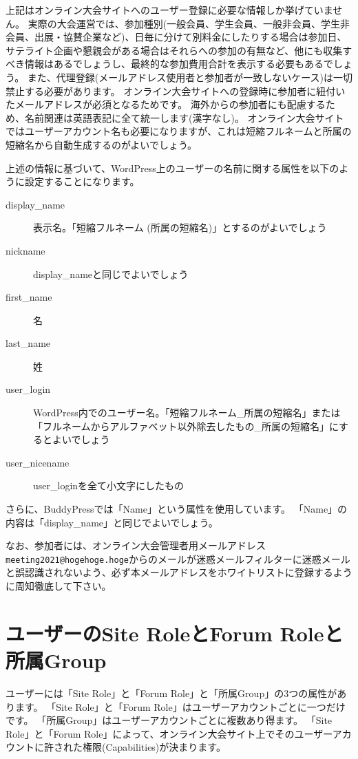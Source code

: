 \documentclass[titlepage,10pt,a4paper,uplatex]{jsbook}
\begin{document}
上記はオンライン大会サイトへのユーザー登録に必要な情報しか挙げていません。
実際の大会運営では、参加種別(一般会員、学生会員、一般非会員、学生非会員、出展・協賛企業など)、日毎に分けて別料金にしたりする場合は参加日、サテライト企画や懇親会がある場合はそれらへの参加の有無など、他にも収集すべき情報はあるでしょうし、最終的な参加費用合計を表示する必要もあるでしょう。
また、代理登録(メールアドレス使用者と参加者が一致しないケース)は一切禁止する必要があります。
オンライン大会サイトへの登録時に参加者に紐付いたメールアドレスが必須となるためです。
海外からの参加者にも配慮するため、名前関連は英語表記に全て統一します(漢字なし)。
オンライン大会サイトではユーザーアカウント名も必要になりますが、これは短縮フルネームと所属の短縮名から自動生成するのがよいでしょう。

上述の情報に基づいて、WordPress上のユーザーの名前に関する属性を以下のように設定することになります。

\begin{description}
\item[display\_name] 表示名。「短縮フルネーム (所属の短縮名)」とするのがよいでしょう
\item[nickname] display\_nameと同じでよいでしょう
\item[first\_name] 名
\item[last\_name] 姓
\item[user\_login] WordPress内でのユーザー名。「短縮フルネーム\_所属の短縮名」または「フルネームからアルファベット以外除去したもの\_所属の短縮名」にするとよいでしょう
\item[user\_nicename] user\_loginを全て小文字にしたもの
\end{description}

さらに、BuddyPressでは「Name」という属性を使用しています。
「Name」の内容は「display\_name」と同じでよいでしょう。

なお、参加者には、オンライン大会管理者用メールアドレス\texttt{meeting2021@hogehoge.hoge}からのメールが迷惑メールフィルターに迷惑メールと誤認識されないよう、必ず本メールアドレスをホワイトリストに登録するように周知徹底して下さい。

\section{ユーザーのSite RoleとForum Roleと所属Group}

ユーザーには「Site Role」と「Forum Role」と「所属Group」の3つの属性があります。
「Site Role」と「Forum Role」はユーザーアカウントごとに一つだけです。
「所属Group」はユーザーアカウントごとに複数あり得ます。
「Site Role」と「Forum Role」によって、オンライン大会サイト上でそのユーザーアカウントに許された権限(Capabilities)が決まります。
\end{document}
